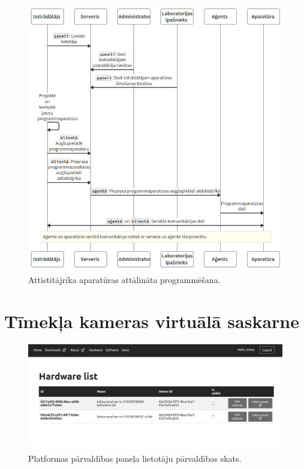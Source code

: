 \begin{figure}[H]
    \includegraphics[width=1.0\linewidth]{assets/agent.png}
    \centering
    \caption{Attīstītājrīka aparatūras attālināta programmēšana.}
    \label{fig:development}
\end{figure}

\section{Tīmekļa kameras virtuālā saskarne}
\label{sec:vinweb}

\begin{figure}[H]
    \includegraphics[width=0.9\linewidth]{assets/mgmt-panel-hw-gray.png}
    \centering
    \caption{Platformas pārvaldības paneļa lietotāju pārvaldības skats.}
    \label{fig:mgmtpanelhw}
\end{figure}

